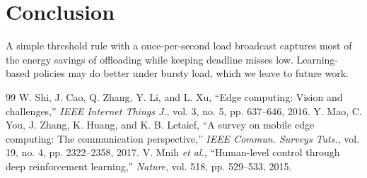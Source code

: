 \documentclass[conference]{IEEEtran}
\begin{document}
\section{Conclusion}
A simple threshold rule with a once-per-second load broadcast captures most of the energy savings of offloading while
keeping deadline misses low. Learning-based policies \cite{mnih} may do better under bursty load, which we leave to
future work.

\begin{thebibliography}{99}
 W. Shi, J. Cao, Q. Zhang, Y. Li, and L. Xu, ``Edge computing: Vision and challenges,'' \emph{IEEE Internet Things J.}, vol. 3, no. 5, pp. 637--646, 2016.
 Y. Mao, C. You, J. Zhang, K. Huang, and K. B. Letaief, ``A survey on mobile edge computing: The communication perspective,'' \emph{IEEE Commun. Surveys Tuts.}, vol. 19, no. 4, pp. 2322--2358, 2017.
 V. Mnih \emph{et al.}, ``Human-level control through deep reinforcement learning,'' \emph{Nature}, vol. 518, pp. 529--533, 2015.
\end{thebibliography}
\end{document}
